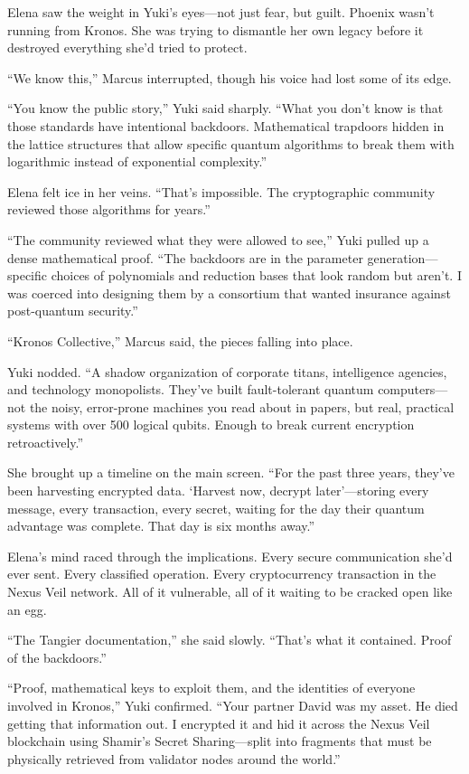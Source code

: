 Elena saw the weight in Yuki's eyes---not just fear, but guilt. Phoenix wasn't running from Kronos. She was trying to dismantle her own legacy before it destroyed everything she'd tried to protect.

``We know this,'' Marcus interrupted, though his voice had lost some of its edge.

``You know the public story,'' Yuki said sharply. ``What you don't know is that those standards have intentional backdoors. Mathematical trapdoors hidden in the lattice structures that allow specific quantum algorithms to break them with logarithmic instead of exponential complexity.''

Elena felt ice in her veins. ``That's impossible. The cryptographic community reviewed those algorithms for years.''

``The community reviewed what they were allowed to see,'' Yuki pulled up a dense mathematical proof. ``The backdoors are in the parameter generation---specific choices of polynomials and reduction bases that look random but aren't. I was coerced into designing them by a consortium that wanted insurance against post-quantum security.''

``Kronos Collective,'' Marcus said, the pieces falling into place.

Yuki nodded. ``A shadow organization of corporate titans, intelligence agencies, and technology monopolists. They've built fault-tolerant quantum computers---not the noisy, error-prone machines you read about in papers, but real, practical systems with over 500 logical qubits. Enough to break current encryption retroactively.''

She brought up a timeline on the main screen. ``For the past three years, they've been harvesting encrypted data. `Harvest now, decrypt later'---storing every message, every transaction, every secret, waiting for the day their quantum advantage was complete. That day is six months away.''

Elena's mind raced through the implications. Every secure communication she'd ever sent. Every classified operation. Every cryptocurrency transaction in the Nexus Veil network. All of it vulnerable, all of it waiting to be cracked open like an egg.

``The Tangier documentation,'' she said slowly. ``That's what it contained. Proof of the backdoors.''

``Proof, mathematical keys to exploit them, and the identities of everyone involved in Kronos,'' Yuki confirmed. ``Your partner David was my asset. He died getting that information out. I encrypted it and hid it across the Nexus Veil blockchain using Shamir's Secret Sharing---split into fragments that must be physically retrieved from validator nodes around the world.''

